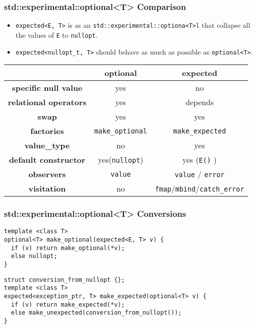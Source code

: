 \documentclass[xcolor=dvipsnames]{beamer}
\newcommand{\cpp}[1]{\lstinline{#1}}
\begin{document}
\begin{frame}[fragile]
\frametitle{std::experimental::optional<T> Comparison}

\begin{itemize}
  \item \cpp{expected<E, T>} is as an \cpp{std::experimental::optiona<T>l} that collapse all the values of \cpp{E} to \cpp{nullopt}.
  \item \cpp{expected<nullopt_t, T>} should behave as much as possible as \cpp{optional<T>}.
\end{itemize}
  
\begin{tabular}{|c|c|c|}
\hline
                    & \textbf{optional} & \textbf{expected}  \\
\hline
\textbf{specific null value} & yes & no \\
\hline
\textbf{relational operators} & yes & depends \\
\hline
\textbf{swap} & yes & yes \\
\hline
\textbf{factories} & \cpp{make_optional} & \cpp{make_expected}  \\
\hline
\textbf{value\_type} & no & yes  \\
\hline
\textbf{default constructor} & yes(\cpp{nullopt})  & yes (\cpp{E()} )  \\
\hline
\textbf{observers} & \cpp{value}  & \cpp{value} / \cpp{error}   \\
\hline
\textbf{visitation} & no & \cpp{fmap}/\cpp{mbind}/\cpp{catch_error}  \\
\hline
\end{tabular}
\end{frame}

\begin{frame}[fragile]
\frametitle{std::experimental::optional<T> Conversions}
\begin{lstlisting}
template <class T>
optional<T> make_optional(expected<E, T> v) {
  if (v) return make_optional(*v);
  else nullopt;
}
\end{lstlisting}

\begin{lstlisting}
struct conversion_from_nullopt {};
template <class T>
expected<exception_ptr, T> make_expected(optional<T> v) {
  if (v) return make_expected(*v);
  else make_unexpected(conversion_from_nullopt());
}
\end{lstlisting}
\end{frame}
\end{document}
